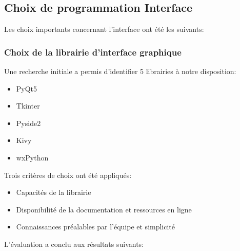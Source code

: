 \subsection{Choix de programmation Interface}

Les choix importants concernant l’interface ont été les suivants:


\subsubsection{Choix de la librairie d’interface graphique}

Une recherche initiale a permis d'identifier 5 librairies à notre disposition:

\begin{itemize}
    \item PyQt5
    \item Tkinter
    \item Pyside2
    \item Kivy
    \item wxPython
\end{itemize}

Trois critères de choix ont été appliqués:

\begin{itemize}
    \item Capacités de la librairie
    \item Disponibilité de la documentation et ressources en ligne
    \item Connaissances préalables par l'équipe et simplicité
\end{itemize}

L'évaluation a conclu aux résultats suivants:\\


